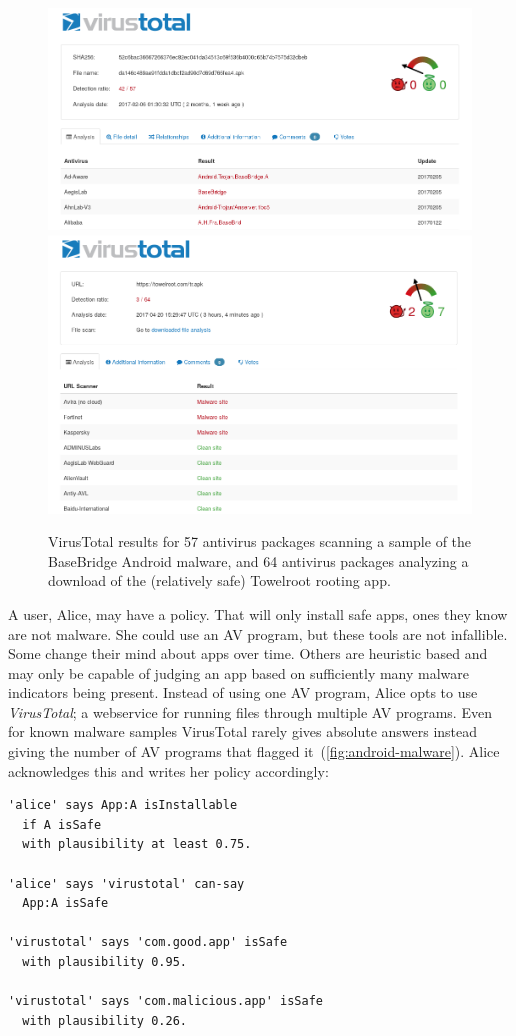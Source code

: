 \documentclass[thesis.tex]{subfiles}
\begin{document}
\begin{figure}
  \centering
  \includegraphics[width=0.49\linewidth]{figures/android-malware.png}
  \includegraphics[width=0.49\linewidth]{figures/towelroot.png}
  \caption[VirusTotal results for two Android apps.]{VirusTotal results for 57
    antivirus packages scanning a sample of the BaseBridge Android malware, and 64
    antivirus packages analyzing a download of the (relatively safe) Towelroot
    rooting app.}
  \label{fig:android-malware}
\end{figure}

A user, Alice, may have a policy. That will only install safe apps, ones they
know are not malware. She could use an \ac{AV} program, but these tools are not
infallible. Some change their mind about apps over time. Others are heuristic
based and may only be capable of judging an app based on sufficiently many
malware indicators being present. Instead of using one \ac{AV} program, Alice
opts to use \emph{VirusTotal}; a webservice for running files through multiple
\ac{AV} programs. Even for known malware samples VirusTotal rarely gives
absolute answers instead giving the number of \ac{AV} programs that flagged
it~(\autoref{fig:android-malware}). Alice acknowledges this and writes her
policy accordingly:

\begin{lstlisting}
'alice' says App:A isInstallable
  if A isSafe
  with plausibility at least 0.75.

'alice' says 'virustotal' can-say
  App:A isSafe

'virustotal' says 'com.good.app' isSafe
  with plausibility 0.95.

'virustotal' says 'com.malicious.app' isSafe
  with plausibility 0.26.
\end{lstlisting}
\end{document}

